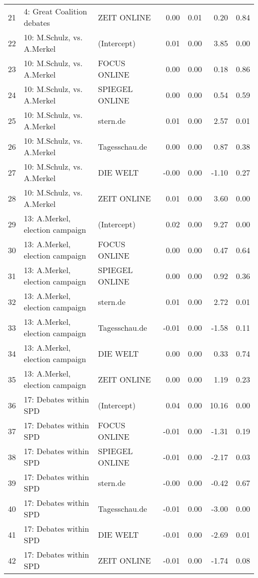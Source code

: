 \begin{table}[ht]
{\begin{tabular}{rllrrrr}
  21 & 4: Great Coalition debates & ZEIT ONLINE & 0.00 & 0.01 & 0.20 & 0.84 \\ 
  22 & 10: M.Schulz, vs. A.Merkel & (Intercept) & 0.01 & 0.00 & 3.85 & 0.00 \\ 
  23 & 10: M.Schulz, vs. A.Merkel & FOCUS ONLINE & 0.00 & 0.00 & 0.18 & 0.86 \\ 
  24 & 10: M.Schulz, vs. A.Merkel & SPIEGEL ONLINE & 0.00 & 0.00 & 0.54 & 0.59 \\ 
  25 & 10: M.Schulz, vs. A.Merkel & stern.de & 0.01 & 0.00 & 2.57 & 0.01 \\ 
  26 & 10: M.Schulz, vs. A.Merkel & Tagesschau.de & 0.00 & 0.00 & 0.87 & 0.38 \\ 
  27 & 10: M.Schulz, vs. A.Merkel & DIE WELT & -0.00 & 0.00 & -1.10 & 0.27 \\ 
  28 & 10: M.Schulz, vs. A.Merkel & ZEIT ONLINE & 0.01 & 0.00 & 3.60 & 0.00 \\ 
  29 & 13: A.Merkel, election campaign & (Intercept) & 0.02 & 0.00 & 9.27 & 0.00 \\ 
  30 & 13: A.Merkel, election campaign & FOCUS ONLINE & 0.00 & 0.00 & 0.47 & 0.64 \\ 
  31 & 13: A.Merkel, election campaign & SPIEGEL ONLINE & 0.00 & 0.00 & 0.92 & 0.36 \\ 
  32 & 13: A.Merkel, election campaign & stern.de & 0.01 & 0.00 & 2.72 & 0.01 \\ 
  33 & 13: A.Merkel, election campaign & Tagesschau.de & -0.01 & 0.00 & -1.58 & 0.11 \\ 
  34 & 13: A.Merkel, election campaign & DIE WELT & 0.00 & 0.00 & 0.33 & 0.74 \\ 
  35 & 13: A.Merkel, election campaign & ZEIT ONLINE & 0.00 & 0.00 & 1.19 & 0.23 \\ 
  36 & 17: Debates within SPD & (Intercept) & 0.04 & 0.00 & 10.16 & 0.00 \\ 
  37 & 17: Debates within SPD & FOCUS ONLINE & -0.01 & 0.00 & -1.31 & 0.19 \\ 
  38 & 17: Debates within SPD & SPIEGEL ONLINE & -0.01 & 0.00 & -2.17 & 0.03 \\ 
  39 & 17: Debates within SPD & stern.de & -0.00 & 0.00 & -0.42 & 0.67 \\ 
  40 & 17: Debates within SPD & Tagesschau.de & -0.01 & 0.00 & -3.00 & 0.00 \\ 
  41 & 17: Debates within SPD & DIE WELT & -0.01 & 0.00 & -2.69 & 0.01 \\ 
  42 & 17: Debates within SPD & ZEIT ONLINE & -0.01 & 0.00 & -1.74 & 0.08 \\ 

\end{tabular}}
\end{table}
